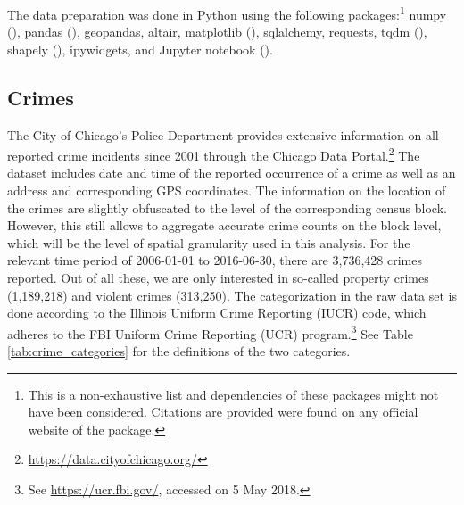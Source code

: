 \documentclass[]{article}
\begin{document}
The data preparation was done in Python using the following packages:\footnote{This is a non-exhaustive list and dependencies of these packages might not have been considered. Citations are provided were found on any official website of the package.} numpy (\citealt{oliphant2006guide}), pandas (\citealt{mckinney2010data}), geopandas, altair, matplotlib (\citealt{Hunter:2007}), sqlalchemy, requests, tqdm (\citealt{casper_da_costa_luis_2018_1251290}), shapely (\citealt{casper_da_costa_luis_2018_1251290}), ipywidgets, and Jupyter notebook (\citealt{Kluyver:2016aa}).


\subsection{Crimes}
\label{sec: crimes}
The City of Chicago's Police Department provides extensive information on all reported crime incidents since 2001 through the Chicago Data Portal.\footnote{\url{https://data.cityofchicago.org/}} The dataset includes date and time of the reported occurrence of a crime as well as an address and corresponding GPS coordinates. The information on the location of the crimes are slightly obfuscated to the level of the corresponding census block. However, this still allows to aggregate accurate crime counts on the block level, which will be the level of spatial granularity used in this analysis. For the relevant time period of 2006-01-01 to 2016-06-30, there are 3,736,428 crimes reported. Out of all these, we are only interested in so-called property crimes (1,189,218) and violent crimes (313,250). The categorization in the raw data set is done according to the Illinois Uniform Crime Reporting (IUCR) code, which adheres to the FBI Uniform Crime Reporting (UCR) program.\footnote{See \url{https://ucr.fbi.gov/}, accessed on 5 May 2018.} See Table \ref{tab:crime_categories} for the definitions of the two categories.
\end{document}
